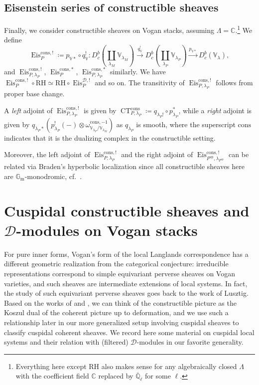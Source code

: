 \documentclass{amsart}
\theoremstyle{definition}
\theoremstyle{remark}
\numberwithin{equation}{section}
\newcommand{\mc}{\mathcal}
\newcommand{\Q}{\mathbb{Q}}
\newcommand{\C}{\mathbb{C}}
\newcommand{\RH}{\mathrm{RH}}
\newcommand{\Gm}{{\mathbb{G}_{\mathrm{m}}}}
\newcommand{\op}{\mathrm{op}}
\DeclareMathOperator{\Eis}{\mathrm{Eis}}
\DeclareMathOperator{\CT}{\mathrm{CT}}
\newcommand{\V}{\mathbb{V}}
\begin{document}
\subsection{Eisenstein series of constructible sheaves}
Finally, we consider constructible sheaves on Vogan stacks, assuming $\Lambda=\C$.\footnote{Everything here except RH also makes sense for any algebraically closed $\Lambda$ with the coefficient field $\C$ replaced by $\overline{\Q}_\ell$ for some $\ell$.} 
We define
\[
\Eis_P^{\mathrm{cons},!}\coloneq p_{\V*}\circ q_{\V}^!\colon D_c^b(\coprod_{\lambda_M} \V_{\lambda_M}) \xrightarrow{q_\V^!} D_c^b (\coprod_{\lambda_P} \V_{\lambda_P}) \xrightarrow{p_{\V*}} D_c^b(\V_\lambda),  
\]
and $\Eis_{P,\lambda_P}^{\mathrm{cons}, !}$, $\Eis_P^{\mathrm{cons},*}$, $\Eis_{P,\lambda_P}^{\mathrm{cons},*}$ similarly. We have $ \Eis_P^{\mathrm{cons}, !} \circ \RH\simeq \RH \circ \Eis_P^{\mathcal{D},!} $ and so on. The transitivity of $\Eis_{P,\lambda_P}^{\mathrm{cons}, !}$ follows from proper base change. 

A \emph{left} adjoint of $\Eis_{P, \lambda_P}^{\mathrm{cons},!}$ is given by $\CT_{P, \lambda_P}^{\mathrm{cons}}\coloneq q_{\lambda_P !}\circ p_{\lambda_P}^*$, while a \emph{right} adjoint is given by $q_{\lambda_P *}(p_{\lambda_P}^!(-) \otimes \omega_{\V_{\lambda_P}/\V_{\lambda_M}}^{\mathrm{cons,-1}})$ as $q_{\lambda_P}$ is smooth, where the superscript $\mathrm{cons}$ indicates that it is the dualizing complex in the constructible setting. 

Moreover, the left adjoint of $\Eis_{P, \lambda_P}^{\mathrm{cons},!}$ and the right adjoint of $\Eis_{P^\op, \lambda_{P^\op}}^{\mathrm{cons},!}$ can be related via Braden's hyperbolic localization \cite{Braden} since all constructible sheaves here are $\Gm$-monodromic, cf.~\cite[Proposition 1.8]{LiuTsaiVilonenXue}. 

\section{Cuspidal constructible sheaves and \texorpdfstring{$\mc D$}{D}-modules on Vogan stacks}{\label{s: DMod}}
For pure inner forms, Vogan's form of the local Langlands correspondence \cite{VoganLLC} has a different geometric realization from the categorical conjecture: irreducible representations correspond to simple equivariant perverse sheaves on Vogan varieties, and such sheaves are intermediate extensions of local systems. In fact, the study of such equivariant perverse sheaves goes back to the work of Lusztig. Based on the works of \cite{Chen2023categorical} and \cite{BCHNconstructible}, we can think of the constructible picture as the Koszul dual of the coherent picture up to deformation, and we use such a relationship later in our more generalized setup involving cuspidal sheaves to classify cuspidal coherent sheaves. We record here some material on cuspidal local systems and their relation with (filtered) $\mc D$-modules in our favorite generality. 
\end{document}
